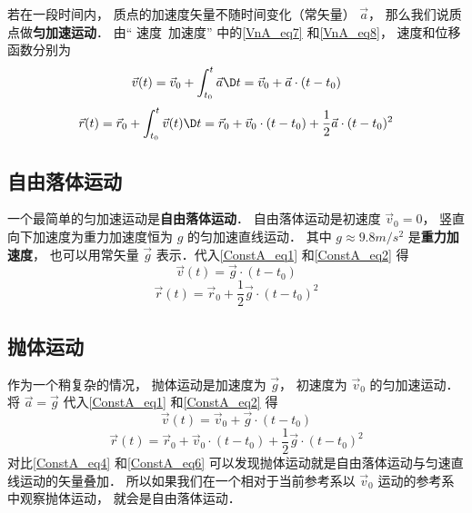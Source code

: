 

若在一段时间内， 质点的加速度矢量不随时间变化（常矢量） $\vec a$， 那么我们说质点做\textbf{匀加速运动}． 由“ 速度\ 加速度” 中的\autoref{VnA_eq7} 和\autoref{VnA_eq8}， 速度和位移函数分别为
\begin{equation}\label{ConstA_eq1}
\vec v(t) = \vec v_0 + \int_{t_0}^{t} \vec a \D t = \vec v_0 + \vec a \cdot (t-t_0)
\end{equation}
\begin{equation}\label{ConstA_eq2}
\vec r(t) = \vec r_0 + \int_{t_0}^{t} \vec v(t) \D t = \vec r_0 + \vec v_0\cdot (t-t_0) + \frac 12 \vec a\cdot (t-t_0)^2
\end{equation}




\subsection{自由落体运动}
一个最简单的匀加速运动是\textbf{自由落体运动}． 自由落体运动是初速度 $\vec v_0 = 0$， 竖直向下加速度为重力加速度恒为 $g$ 的匀加速直线运动． 其中 $g\approx 9.8m/s^2$ 是\textbf{重力加速度}， 也可以用常矢量 $\vec g$ 表示．代入\autoref{ConstA_eq1} 和\autoref{ConstA_eq2} 得
\begin{equation}\label{ConstA_eq3}
\vec v(t) = \vec g \cdot (t-t_0)
\end{equation}
\begin{equation}\label{ConstA_eq4}
\vec r(t) = \vec r_0 + \frac 12 \vec g \cdot (t-t_0)^2
\end{equation}

\subsection{抛体运动}
作为一个稍复杂的情况， 抛体运动是加速度为 $\vec g$， 初速度为 $\vec v_0$ 的匀加速运动． 将 $\vec a = \vec g$ 代入\autoref{ConstA_eq1} 和\autoref{ConstA_eq2} 得
\begin{equation}\label{ConstA_eq5}
\vec v(t) = \vec v_0 + \vec g \cdot (t-t_0)
\end{equation}
\begin{equation}\label{ConstA_eq6}
\vec r(t) = \vec r_0 + \vec v_0\cdot (t-t_0) + \frac 12 \vec g\cdot (t-t_0)^2
\end{equation}
对比\autoref{ConstA_eq4} 和\autoref{ConstA_eq6} 可以发现抛体运动就是自由落体运动与匀速直线运动的矢量叠加． 所以如果我们在一个相对于当前参考系以 $\vec v_0$ 运动的参考系中观察抛体运动， 就会是自由落体运动．

